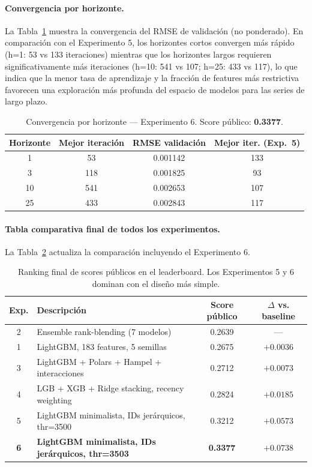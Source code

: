 \documentclass{article}
\begin{document}
\paragraph{Convergencia por horizonte.}
La Tabla~\ref{tab:exp6_conv} muestra la convergencia del RMSE de validación (no ponderado). En comparación con el Experimento 5, los horizontes cortos convergen más rápido (h=1: 53 vs 133 iteraciones) mientras que los horizontes largos requieren significativamente más iteraciones (h=10: 541 vs 107; h=25: 433 vs 117), lo que indica que la menor tasa de aprendizaje y la fracción de features más restrictiva favorecen una exploración más profunda del espacio de modelos para las series de largo plazo.

\begin{table}[h!]
  \caption{Convergencia por horizonte — Experimento 6. Score público: \textbf{0.3377}.}
  \label{tab:exp6_conv}
  \centering
  \begin{tabular}{cccc}
    \toprule
    Horizonte & Mejor iteración & RMSE validación & Mejor iter. (Exp.~5) \\
    \midrule
    1  &  53 & 0.001142 & 133 \\
    3  & 118 & 0.001825 &  93 \\
    10 & 541 & 0.002653 & 107 \\
    25 & 433 & 0.002843 & 117 \\
    \bottomrule
  \end{tabular}
\end{table}

\paragraph{Tabla comparativa final de todos los experimentos.}
La Tabla~\ref{tab:resumen_scores_final} actualiza la comparación incluyendo el Experimento 6.

\begin{table}[h!]
  \caption{Ranking final de scores públicos en el leaderboard. Los Experimentos 5 y 6 dominan con el diseño más simple.}
  \label{tab:resumen_scores_final}
  \centering
  \begin{tabular}{clcc}
    \toprule
    Exp. & Descripción & Score público & $\Delta$ vs. baseline \\
    \midrule
    2 & Ensemble rank-blending (7 modelos)                   & 0.2639 & --- \\
    1 & LightGBM, 183 features, 5 semillas                   & 0.2675 & $+0.0036$ \\
    3 & LightGBM + Polars + Hampel + interacciones           & 0.2712 & $+0.0073$ \\
    4 & LGB + XGB + Ridge stacking, recency weighting        & 0.2824 & $+0.0185$ \\
    5 & LightGBM minimalista, IDs jerárquicos, thr=3500      & 0.3212 & $+0.0573$ \\
    \textbf{6} & \textbf{LightGBM minimalista, IDs jerárquicos, thr=3503} & \textbf{0.3377} & $\mathbf{+0.0738}$ \\
    \bottomrule
  \end{tabular}
\end{table}
\end{document}

